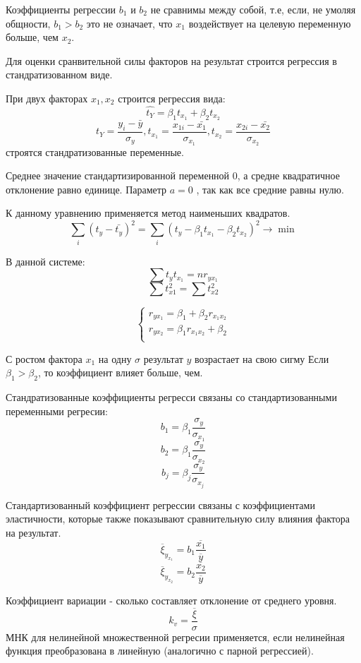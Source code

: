 \documentclass[aps,%
12pt,%
final,%
oneside,
onecolumn,%
musixtex, %
superscriptaddress,%
centertags]{article} %
\begin{document}
Коэффициенты регрессии $b_1$ и $b_2$ не сравнимы между собой, т.е, если, не умоляя общности, $b_1>b_2$ это не означает, что $x_1$ воздействует на целевую переменную больше, чем $x_2$.

Для оценки сранвительной силы факторов на результат строится регрессия в стандратизованном виде. 

При двух факторах $x_1,x_2$ строится регрессия вида:
$$ \hat{t_Y} = \beta_1t_{x_1} + \beta_2t_{x_2} $$
$$t_{Y} = \frac{y_i-\bar{y}}{\sigma_y}, t_{x_1} = \frac{x_{1i}-\bar{x_1}}{\sigma_{x_1}}, t_{x_2} = \frac{x_{2i}-\bar{x_2}}{\sigma_{x_2}}$$
строятся стандратизованные переменные. 

Среднее значение стандартизированной переменной 0, а средне квадратичное отклонение равно единице. Параметр $a=0$ , так как все средние равны нулю. 

К данному уравнению применяется метод наименьших квадратов.
$$ \sum_{i} (t_{y} - \bar{t_y})^2 = \sum_i (t_y - \beta_1t_{x_1} - \beta_2 t_{x_2})^2 \to \min $$

В данной системе:
$$\sum t_y t_{x_1} = n r_{yx_1} $$
$$\sum t_{x1}^2 = \sum t_{x2}^2 $$

$$\left \{
\begin{matrix}
r_{yx_1} = \beta_1 + \beta_2r_{x_1 x_2} \\
r_{yx_2} = \beta_1r_{x_1 x_2} + \beta_2 \\
\end{matrix}
\right.
$$

С ростом фактора $x_1$ на одну $\sigma$ результат $y$ возрастает на свою сигму
Если $\beta_1 > \beta_2$, то коэффициент влияет больше, чем.

Стандратизованные коэффициенты регресси связаны со стандартизованными переменными регресии:
$$ b_1 = \beta_1 \frac{\sigma_y}{\sigma_{x_1}}$$
$$ b_2 = \beta_1 \frac{\sigma_y}{\sigma_{x_2}}$$
$$ b_j = \beta_j \frac{\sigma_y}{\sigma_{x_j}}$$

Стандартизованный коэффициент регрессии связаны с коэффициентами эластичности, которые также показывают сравнительную силу влияния фактора на результат.
$$ \overline{\xi}_{y_{x_1}} = b_1 \frac{\overline{x_1}}{\overline{y}}$$
$$ \overline{\xi}_{y_{x_2}} = b_2 \frac{\overline{x_2}}{\overline{y}} $$

Коэффициент вариации - сколько составляет отклонение от среднего уровня.
$$ k_v = \frac{\overline{\xi}}{\sigma} $$
МНК для нелинейной множественной регресии применяется, если нелинейная функция преобразована в линейную (аналогично с парной регрессией).
\end{document}
